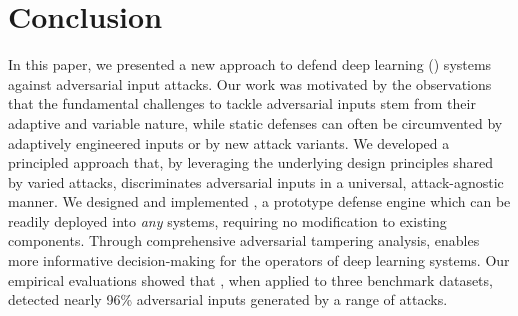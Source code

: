 \section{Conclusion}
\label{sec:conclusion}


In this paper, we presented a new approach to defend deep learning (\dl) systems against adversarial input attacks. Our work was motivated by the observations that the fundamental challenges to tackle adversarial inputs stem from their adaptive and variable nature, while static defenses can often be circumvented by adaptively engineered inputs or by new attack variants. We developed a principled approach that, by leveraging the underlying design principles shared by varied attacks, discriminates adversarial inputs in a universal, attack-agnostic manner. We designed and implemented \system, a prototype defense engine which can be readily deployed into {\em any} \dl systems, requiring no modification to existing components. Through comprehensive adversarial tampering analysis, \system enables more informative decision-making for the operators of deep learning systems. Our empirical evaluations showed that \system, when applied to three benchmark datasets, detected nearly 96\% adversarial inputs generated by a range of attacks.
